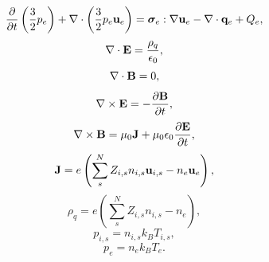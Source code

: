 \documentclass[a4paper,11pt]{report}
\begin{document}
\begin{equation}
    \label{eq:mf_np1fluid_iee}
    \frac{\partial}{\partial t} \left ( \frac{3}{2} p_e \right ) + \nabla \cdot \left ( \frac{3}{2} p_e \mathbf{u}_e \right ) = \bm \sigma_e : \nabla \mathbf{u}_e - \nabla \cdot \mathbf{q}_e + Q_e,
\end{equation}
\begin{equation}
    \label{eq:mf_np1fluid_maxwell_3}
    \nabla \cdot \mathbf{E} = \frac{\rho_q}{\epsilon_0},
\end{equation}
\begin{equation}
    \label{eq:mf_np1fluid_maxwell_4}
    \nabla \cdot \mathbf{B} = 0,
\end{equation}
\begin{equation}
    \label{eq:mf_np1fluid_maxwell_1}
    \nabla \times \mathbf{E} = -\frac{ \partial \mathbf{B}}{\partial t},
\end{equation}
\begin{equation}
    \label{eq:mf_np1fluid_maxwell_2}
    \nabla \times \mathbf{B} = \mu_0 \mathbf{J} + \mu_0 \epsilon_0 \frac{\partial \mathbf{E}}{\partial t},
\end{equation}
\begin{equation}
    \label{eq:mf_np1fluid_curr_density}
    \mathbf{J} = e \left(\sum_s^N Z_{i,s} n_{i,s} \mathbf{u}_{i,s} - n_e \mathbf{u}_e \right),
\end{equation}
\begin{equation}
    \label{eq:mf_np1fluid_mass_density}
    \rho_q = e \left( \sum_s^N Z_{i,s} n_{i,s} - n_e \right),
\end{equation}
\begin{equation}
    \label{eq:mf_np1fluid_eos_ion}
    p_{i,s} = n_{i,s} k_B T_{i,s},
\end{equation}
\begin{equation}
    \label{eq:mf_np1fluid_eos_elec}
    p_e = n_e k_B T_e.
\end{equation}

\end{document}
